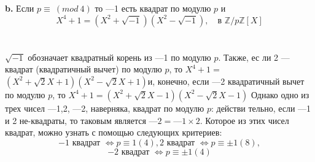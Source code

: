 \hspace*{15pt}\textbf{b.} Если $p \equiv ~(mod~ 4)$ то —1 есть квадрат по модулю $p$ и
$$X^{4} + 1 = (X^{2} + \sqrt{-1})(X^{2} - \sqrt{-1}),\quad\text{в }\mathbb{Z}/p\mathbb{Z}[X]$$\\
\\
$\sqrt{-1}$ обозначает квадратный корень из —1 по модулю $p$. Также, ес­\linebreak
ли 2 --- квадрат (квадратичный вычет) по модулю $p$, то $X^{4} + 1 = $\linebreak
$(X^{2} + \sqrt{2}X + 1)(X^{2} - \sqrt{2}X + 1)$и, конечно, если —2 квадратичный вычет\linebreak
по модулю $p$, то $X^{4} + 1 = (X^{2} + \sqrt{2}X - 1)(X^{2} - \sqrt{2}X - 1)$ Однако\linebreak
одно из трех чисел —1,2, —2, наверняка, квадрат по модулю $p$: действи­\linebreak
тельно, если —1 и 2 не-квадраты, то таковым является $—2 = —1 \times 2.$\linebreak
Которое из этих чисел квадрат, можно узнать с помощью следующих\linebreak
критериев:
$$-1\text{ квадрат }\Leftrightarrow p \equiv 1 (4), 2\text{ квадрат } \Leftrightarrow p \equiv \pm 1 (8),$$
$$-2\text{ квадрат }\Leftrightarrow p \equiv \pm 1 (4)$$

